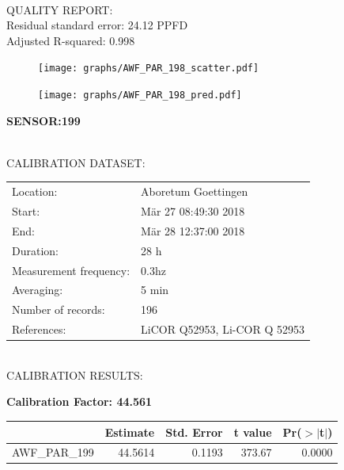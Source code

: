 \documentclass[oneside]{report}
\begin{document}
\hrulefill\\
QUALITY REPORT:\\
Residual standard error: 24.12 PPFD\\
Adjusted R-squared: 0.998



\begin{figure}[H]
  \centering
  \texttt{[image: graphs/AWF\_PAR\_198\_scatter.pdf]}
\end{figure}




\begin{figure}[H]
  \centering
  \texttt{[image: graphs/AWF\_PAR\_198\_pred.pdf]}
\end{figure}

\pagebreak


\begin{center}
\large{\textbf{SENSOR:199}}\\
\end{center}

\hrulefill\\
CALIBRATION DATASET:\\
\begin{table}[h!]
  \centering
  \label{tab:table1}
  \begin{tabular}{ll}
    Location: & Aboretum Goettingen\\ 
    
    
    Start:  & Mär 27 08:49:30 2018 \\
    End:   & Mär 28 12:37:00 2018\\ 
    Duration: & 28 h\\
    Measurement frequency: & 0.3hz\\
    Averaging:  &5 min\\
    Number of records: & 196 \\
    References: & LiCOR Q52953, Li-COR Q 52953 \\
  \end{tabular}
\end{table}

\hrulefill\\
CALIBRATION RESULTS:\\


\begin{center}
\textbf{\large{Calibration Factor: 44.561}}\\
\end{center}
\begin{table}[ht]
\centering
\begin{tabular}{rrrrr}
  \hline
 & Estimate & Std. Error & t value & Pr($>$$|$t$|$) \\ 
  \hline
AWF\_PAR\_199 & 44.5614 & 0.1193 & 373.67 & 0.0000 \\ 
   \hline
\end{tabular}
\end{table}
\end{document}
